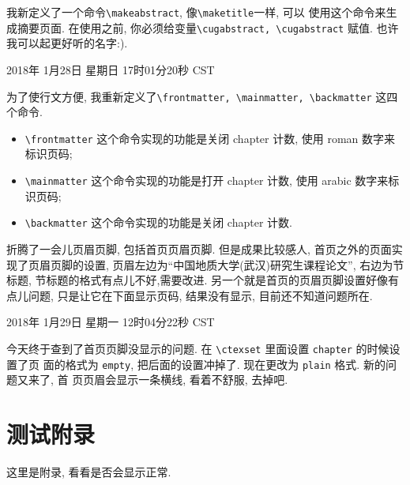 \documentclass{cugrep}
\begin{document}
我新定义了一个命令\verb|\makeabstract|, 像\verb|\maketitle|一样, 可以
使用这个命令来生成摘要页面. 在使用之前, 你必须给变量\verb|\cugabstract, \cugabstract| 赋值. 也许我可以起更好听的名字:).

2018年 1月28日 星期日 17时01分20秒 CST

为了使行文方便, 我重新定义了\verb|\frontmatter, \mainmatter, \backmatter| 这四个命令. 

\begin{itemize}
    \item \verb|\frontmatter| 这个命令实现的功能是关闭 chapter 计数, 使用 roman 数字来标识页码;
    \item \verb|\mainmatter| 这个命令实现的功能是打开 chapter 计数, 使用 arabic 数字来标识页码;
    \item \verb|\backmatter| 这个命令实现的功能是关闭 chapter 计数.
\end{itemize}

折腾了一会儿页眉页脚, 包括首页页眉页脚. 但是成果比较感人, 首页之外的页面实现了页眉页脚的设置,
页眉左边为``中国地质大学(武汉)研究生课程论文'', 右边为节标题, 节标题的格式有点儿不好,需要改进.
另一个就是首页的页眉页脚设置好像有点儿问题, 只是让它在下面显示页码, 结果没有显示, 目前还不知道问题所在. 

2018年 1月29日 星期一 12时04分22秒 CST

今天终于查到了首页页脚没显示的问题. 在 \verb|\ctexset| 里面设置 \verb|chapter| 的时候设置了页
面的格式为 \verb|empty|, 把后面的设置冲掉了. 现在更改为 \verb|plain| 格式. 新的问题又来了, 首
页页眉会显示一条横线, 看着不舒服, 去掉吧. 

\appendix
\chapter{测试附录}
这里是附录, 看看是否会显示正常.

\backmatter 
\end{document}
